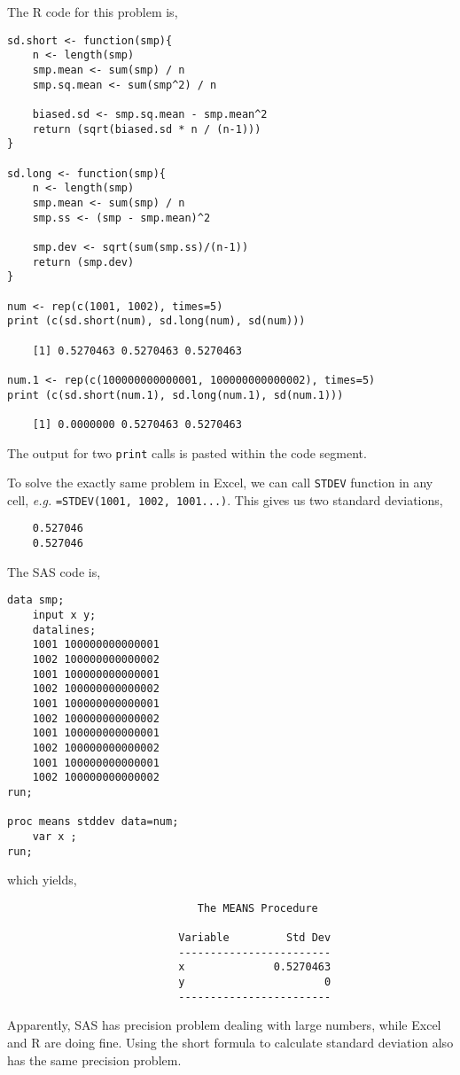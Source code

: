 \documentclass[letter]{article}
\begin{document}
    \section{}
    The R code for this problem is,
    \begin{verbatim}
sd.short <- function(smp){
    n <- length(smp)
    smp.mean <- sum(smp) / n
    smp.sq.mean <- sum(smp^2) / n 

    biased.sd <- smp.sq.mean - smp.mean^2
    return (sqrt(biased.sd * n / (n-1)))
}

sd.long <- function(smp){
    n <- length(smp)
    smp.mean <- sum(smp) / n 
    smp.ss <- (smp - smp.mean)^2

    smp.dev <- sqrt(sum(smp.ss)/(n-1))
    return (smp.dev)
}

num <- rep(c(1001, 1002), times=5) 
print (c(sd.short(num), sd.long(num), sd(num)))

    [1] 0.5270463 0.5270463 0.5270463

num.1 <- rep(c(100000000000001, 100000000000002), times=5)
print (c(sd.short(num.1), sd.long(num.1), sd(num.1)))

    [1] 0.0000000 0.5270463 0.5270463
    \end{verbatim}
    The output for two \verb=print= calls is pasted within the code segment.

    To solve the exactly same problem in Excel, we can call \verb=STDEV= 
    function in any cell, \emph{e.g.} \verb|=STDEV(1001, 1002, 1001...)|.
    This gives us two standard deviations,
    \begin{verbatim}
    0.527046
    0.527046
    \end{verbatim}

    The SAS code is,
    \begin{verbatim}
data smp;
	input x y;
	datalines;
	1001 100000000000001
	1002 100000000000002
	1001 100000000000001
	1002 100000000000002
	1001 100000000000001
	1002 100000000000002
	1001 100000000000001
	1002 100000000000002
	1001 100000000000001
	1002 100000000000002
run;

proc means stddev data=num;
	var x ;
run;
    \end{verbatim}
    which yields,
    \begin{verbatim}
                              The MEANS Procedure

                           Variable         Std Dev
                           ------------------------
                           x              0.5270463
                           y                      0
                           ------------------------
    \end{verbatim}
    Apparently, SAS has precision problem dealing with large numbers, while
    Excel and R are doing fine. 
    Using the short formula to calculate standard deviation also has the same
    precision problem.
\end{document}
